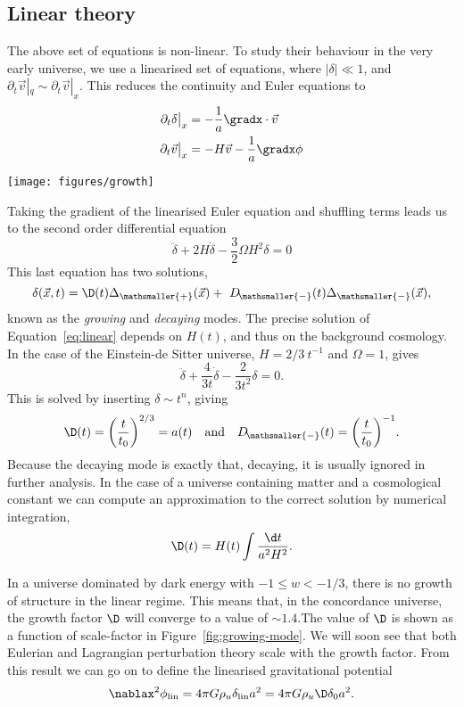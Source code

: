 \begin{subappendices}
\subsection{Linear theory}
The above set of equations is non-linear. To study their behaviour in the very early universe, we use a linearised set of equations, where $|\delta| \ll 1$, and $\partial_t \vec{v}|_q \sim \partial_t \vec{v}|_x$. This reduces the continuity and Euler equations to
\begin{align}
\partial_t \delta\big|_x &= -\frac{1}{a}\gradx \cdot \vec{v} \\
\partial_t \vec{v}\big|_x &= -H\vec{v} - \frac{1}{a}\gradx\phi
\end{align}

\begin{SCfigure}[1.0]
\texttt{[image: figures/growth]}
\caption{Growing mode solution in Einstein-de Sitter and concordance model.
Notice that in the concordance model linear structure formation eventually stops.}
\label{fig:growing-mode}
\end{SCfigure}

Taking the gradient of the linearised Euler equation and shuffling terms leads us to
the second order differential equation
\[\ddot{\delta} + 2H \dot{\delta} - \frac{3}{2}\Omega H^2 \delta = 0 \label{eq:linear}\]
This last equation has two solutions,
\[\delta(\vec{x}, t) = \D(t)\Delta_{\mathsmaller{+}}(\vec{x}) + \ D_{\!\mathsmaller{-} }(t)\Delta_{\mathsmaller{-}}(\vec{x}),\]
known as the \emph{growing} and \emph{decaying} modes. The precise solution of Equation~\ref{eq:linear}
depends on $H(t)$, and thus on the background cosmology. In the case of the Einstein-de Sitter universe,
$H = 2/3\ t^{-1}$ and $\Omega = 1$, gives
\[\ddot{\delta} + \frac{4}{3t}\dot{\delta} - \frac{2}{3 t^2}\delta = 0.\]
This is solved by inserting $\delta \sim t^n$, giving
\[
    \D(t) = {\left(\frac{t}{t_0}\right)}^{2/3} = a(t)\quad \textrm{and}\quad D_{\!\mathsmaller{-}}(t) = {\left(\frac{t}{t_0}\right)}^{-1}.
\]
Because the decaying mode is exactly that, decaying, it is usually ignored in further analysis. In the case of a universe containing matter and a cosmological constant we can compute an approximation to the correct solution by numerical integration,
\[\D(t) = H(t) \int \frac{\d t}{a^2 H^2}.\]

In a universe dominated by dark energy with $-1 \le w < -1/3$, there is no growth of structure in the linear regime. This means that, in the concordance universe,  the growth factor $\D$ will converge to a value of $\sim 1.4$.The value of $\D$ is shown as a function of scale-factor in Figure~\ref{fig:growing-mode}. We will soon see that both Eulerian and Lagrangian perturbation theory scale with the growth factor. From this result we can go on to define the linearised gravitational potential
\[\nablax^2 \phi_{\rm lin} = 4\pi G \rho_u \delta_{\rm lin} a^2 = 4\pi G \rho_u \D \delta_0 a^2.\]


\end{subappendices}
